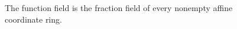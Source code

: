 \begin{figure}[htbp]\centering
{}
\caption{The function field is the fraction field of every nonempty affine coordinate ring.}\label{fig:vi27-frac}\end{figure}
